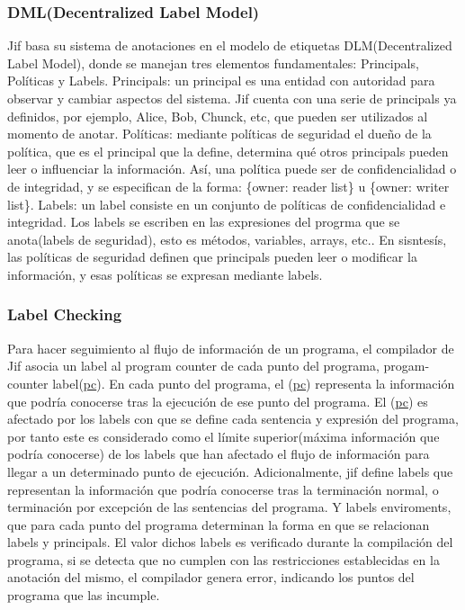 \subsubsection{DML(Decentralized Label Model)}
Jif basa su sistema de anotaciones en el modelo de etiquetas DLM(Decentralized
Label Model), donde se manejan tres elementos fundamentales: Principals,
Políticas y Labels.\newline
Principals: un principal es una entidad con autoridad para observar y cambiar
aspectos del sistema. Jif cuenta con una serie de principals ya
definidos, por ejemplo, Alice, Bob, Chunck, etc, que pueden ser
utilizados al momento de anotar.\newline 
Políticas: mediante políticas de seguridad el dueño de la política, que es el
principal que la define, determina qué otros principals pueden leer o
influenciar la información. Así, una política puede ser de confidencialidad o de
integridad, y se especifican de la forma: \{owner: reader list\} u
\{owner: writer list\}.\newline 
Labels: un label consiste en un conjunto de políticas de confidencialidad e
integridad. Los labels se escriben en las expresiones del progrma que se
anota(labels de seguridad), esto es métodos, variables, arrays, etc..\newline 
En sisntesís, las políticas de seguridad definen que principals pueden leer o
modificar la información, y esas políticas se expresan mediante labels.

\subsubsection{Label Checking}
Para hacer seguimiento al flujo de información de un programa, el compilador de
Jif asocia un label al program counter de cada punto del programa,
progam-counter label(\underline{pc}). En cada punto del programa, el
(\underline{pc}) representa la información que podría conocerse tras la
ejecución de ese punto del programa.
El (\underline{pc}) es afectado por los labels con que se define cada sentencia
y expresión del programa, por tanto este es considerado como el límite
superior(máxima información que podría conocerse) de los labels que han afectado
el flujo de información para llegar a un determinado punto de ejecución.\newline
Adicionalmente, jif define labels que representan la información que podría
conocerse tras la terminación normal, o terminación por excepción de las
sentencias del programa. Y labels enviroments, que para cada punto del programa
determinan la forma en que se relacionan labels y principals.\newline
El valor dichos labels es verificado durante la compilación del programa, si se
detecta que no cumplen con las restricciones establecidas en la anotación del
mismo, el compilador genera error, indicando los puntos del programa que las
incumple.\newline

